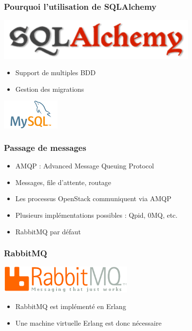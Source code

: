   \begin{frame}
    \frametitle{Pourquoi l'utilisation de SQLAlchemy}
    \begin{center}
      \includegraphics[width=10cm]{images/sqlalchemy-logo.png}
    \end{center}
    \begin{itemize}
      \item Support de multiples BDD
      \item Gestion des migrations
    \end{itemize}
    \begin{center}
      \includegraphics{images/mysql-logo.png}
    \end{center}
  \end{frame}

  \begin{frame}
    \frametitle{Passage de messages}
    \begin{itemize}
      \item AMQP : Advanced Message Queuing Protocol
      \item Messages, file d'attente, routage
      \item Les processus OpenStack communiquent via AMQP
      \item Plusieurs implémentations possibles : Qpid, 0MQ, etc.
      \item RabbitMQ par défaut
    \end{itemize}
  \end{frame}

  \begin{frame}
  \frametitle{RabbitMQ}
    \begin{center}
      \includegraphics{images/rabbitmq-logo.png}
    \end{center}
    \begin{itemize}
      \item RabbitMQ est implémenté en Erlang
      \item Une machine virtuelle Erlang est donc nécessaire
    \end{itemize}
  \end{frame}

